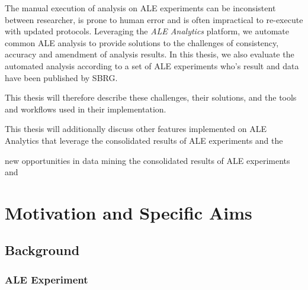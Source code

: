 \documentclass[12pt,final,masters,chapterheads]{ucsd}  %
\begin{document}
The manual execution of analysis on ALE experiments can be inconsistent between researcher, is prone to human error and is often impractical to re-execute with updated protocols. Leveraging the \textit{ALE Analytics} platform, we automate common ALE analysis to provide solutions to the challenges of consistency, accuracy and amendment of analysis results. In this thesis, we also evaluate the automated analysis according to a set of ALE experiments who's result and data have been published by SBRG.

This thesis will therefore describe these challenges, their solutions, and the tools and workflows used in their implementation.

This thesis will additionally discuss  other features implemented on ALE Analytics that leverage the consolidated results of ALE experiments and the 

new opportunities in data mining the consolidated results of ALE experiments and 


\chapter{Motivation and Specific Aims}

%
%
%
%

%
%

%
%

\section{Background}
\subsection{ALE Experiment}
\end{document}
